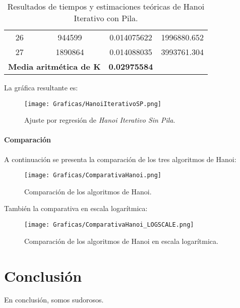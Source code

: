 \documentclass[a4paper,12pt]{article} %
\begin{document}
\begin{table}[H]
{\begin{tabular}{|c|c|c|c|}
			26                                                 & 944599               & 0.014075622              & 1996880.652                                          \\
			27                                                 & 1890864              & 0.014088035              & 3993761.304                                          \\
			\hline
			\multicolumn{2}{l}{\textbf{Media aritmética de K}} & \textbf{0.02975584}                                                                                    \\
			\hline
		\end{tabular}
	}
	\caption{Resultados de tiempos y estimaciones teóricas de Hanoi Iterativo con Pila.}
	\label{tab:tiempos}
\end{table}
La gráfica resultante es:
\begin{figure}[H]
	\centering
	\texttt{[image: Graficas/HanoiIterativoSP.png]}
	\caption{Ajuste por regresión de \textit{Hanoi Iterativo Sin Pila}.}
\end{figure}

\paragraph{Comparación}

A continuación se presenta la comparación de los tres algoritmos de Hanoi:

\begin{figure}[H]
	\centering
	\texttt{[image: Graficas/ComparativaHanoi.png]}
	\caption{Comparación de los algoritmos de Hanoi.}
\end{figure}

También la comparativa en escala logarítmica:

\begin{figure}[H]
	\centering
	\texttt{[image: Graficas/ComparativaHanoi\_LOGSCALE.png]}
	\caption{Comparación de los algoritmos de Hanoi en escala logarítmica.}
\end{figure}

\section{Conclusión}
En conclusión, somos sudorosos.
\end{document}
